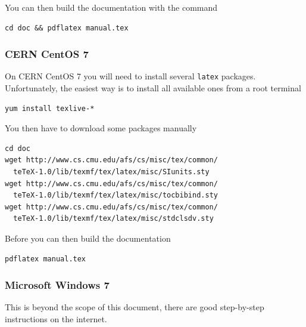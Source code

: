 \documentclass[a4paper]{article}
\begin{document}
You can then build the documentation with the command

\medskip
\begin{lstlisting}
cd doc && pdflatex manual.tex
\end{lstlisting}
\medskip

\subsubsection{CERN CentOS 7}

On CERN CentOS 7 you will need to install several {\tt latex} packages.
Unfortunately, the easiest way is to install all available ones from a root terminal

\medskip
\begin{lstlisting}
yum install texlive-*
\end{lstlisting}
\medskip

You then have to download some packages manually

\medskip
\begin{lstlisting}
cd doc
wget http://www.cs.cmu.edu/afs/cs/misc/tex/common/
  teTeX-1.0/lib/texmf/tex/latex/misc/SIunits.sty
wget http://www.cs.cmu.edu/afs/cs/misc/tex/common/
  teTeX-1.0/lib/texmf/tex/latex/misc/tocbibind.sty
wget http://www.cs.cmu.edu/afs/cs/misc/tex/common/
  teTeX-1.0/lib/texmf/tex/latex/misc/stdclsdv.sty
\end{lstlisting}
\medskip

Before you can then build the documentation

\medskip
\begin{lstlisting}
pdflatex manual.tex
\end{lstlisting}
\medskip

\subsubsection{Microsoft Windows 7}

This is beyond the scope of this document, there are good step-by-step instructions on the internet.
\end{document}
